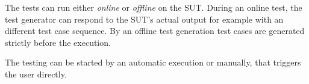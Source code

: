 The tests can run either \textit{online} or \textit{offline} on the SUT. During an online test, the test generator can respond to the SUT's actual output for example with an different test case sequence. By an offline test generation test cases are generated strictly before the execution.
	
The testing can be started by an automatic execution or manually, that triggers the user directly.


